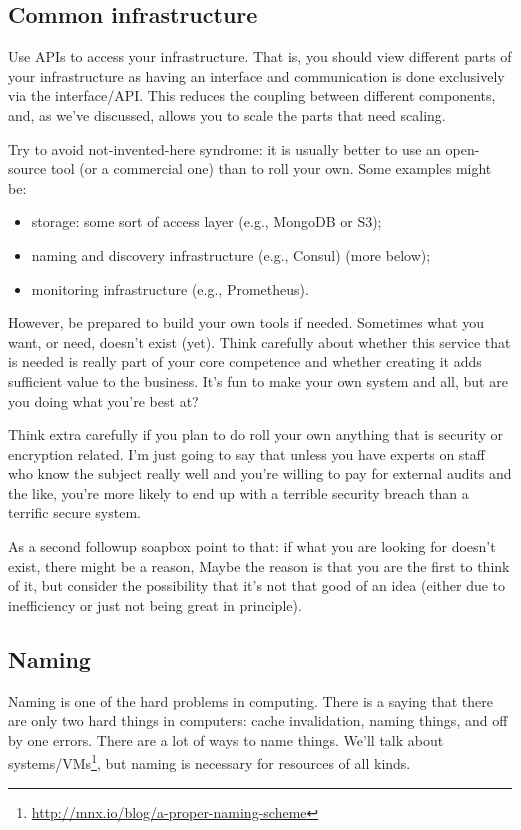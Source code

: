 \documentclass[a4paper]{report}
\begin{document}
\subsection*{Common infrastructure}
Use APIs to access your infrastructure. That is, you should view different parts of your infrastructure as having an interface and communication is done exclusively via the interface/API. This reduces the coupling between different components, and, as we've discussed, allows you to scale the parts that need scaling. 

Try to avoid not-invented-here syndrome: it is usually better to use an open-source tool (or a commercial one) than to roll your own. Some examples might be:
\begin{itemize}
\item storage: some sort of access layer (e.g., MongoDB or S3);
\item naming and discovery infrastructure (e.g., Consul) (more below);
\item monitoring infrastructure (e.g., Prometheus).
\end{itemize}

However, be prepared to build your own tools if needed. Sometimes what you want, or need, doesn't exist (yet). Think carefully about whether this service that is needed is really part of your core competence and whether creating it adds sufficient value to the business. It's fun to make your own system and all, but are you doing what you're best at? 

Think extra carefully if you plan to do roll your own anything that is security or encryption related. I'm just going to say that unless you have experts on staff who know the subject really well and you're willing to pay for external audits and the like, you're more likely to end up with a terrible security breach than a terrific secure system. 

As a second followup soapbox point to that: if what you are looking for doesn't exist, there might be a reason, Maybe the reason is that you are the first to think of it, but consider the possibility that it's not that good of an idea (either due to inefficiency or just not being great in principle).  

\subsection*{Naming}
Naming is one of the hard problems in computing. There is a saying that there are only two hard things in computers: cache invalidation, naming things, and off by one errors.  There are a
lot of ways to name things. We'll talk about
systems/VMs\footnote{\url{http://mnx.io/blog/a-proper-naming-scheme}},
but naming is necessary for resources of all kinds.
\end{document}
